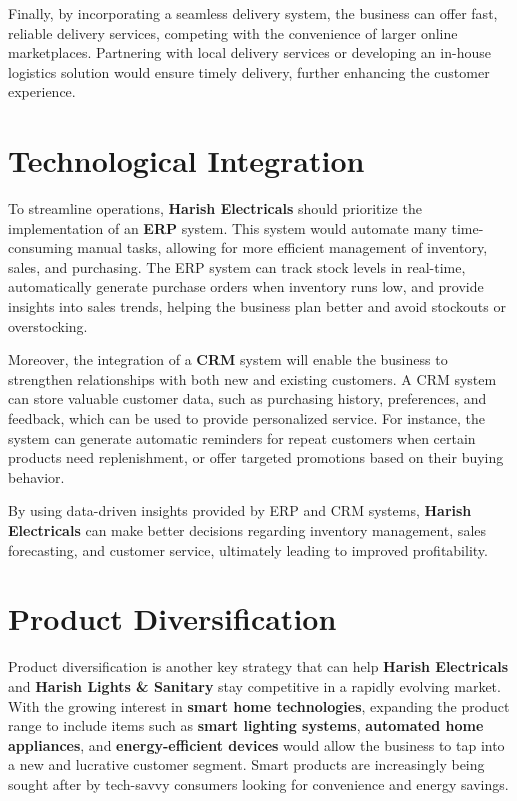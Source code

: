 \documentclass[a4paper,12pt]{report}
\begin{document}
Finally, by incorporating a seamless delivery system, the business can offer fast, reliable delivery services, competing with the convenience of larger online marketplaces. Partnering with local delivery services or developing an in-house logistics solution would ensure timely delivery, further enhancing the customer experience.

\section{Technological Integration}
To streamline operations, \textbf{Harish Electricals} should prioritize the implementation of an \textbf{ERP} system. This system would automate many time-consuming manual tasks, allowing for more efficient management of inventory, sales, and purchasing. The ERP system can track stock levels in real-time, automatically generate purchase orders when inventory runs low, and provide insights into sales trends, helping the business plan better and avoid stockouts or overstocking.

Moreover, the integration of a \textbf{CRM} system will enable the business to strengthen relationships with both new and existing customers. A CRM system can store valuable customer data, such as purchasing history, preferences, and feedback, which can be used to provide personalized service. For instance, the system can generate automatic reminders for repeat customers when certain products need replenishment, or offer targeted promotions based on their buying behavior.

By using data-driven insights provided by ERP and CRM systems, \textbf{Harish Electricals} can make better decisions regarding inventory management, sales forecasting, and customer service, ultimately leading to improved profitability.

\section{Product Diversification}
Product diversification is another key strategy that can help \textbf{Harish Electricals} and \textbf{Harish Lights \& Sanitary} stay competitive in a rapidly evolving market. With the growing interest in \textbf{smart home technologies}, expanding the product range to include items such as \textbf{smart lighting systems}, \textbf{automated home appliances}, and \textbf{energy-efficient devices} would allow the business to tap into a new and lucrative customer segment. Smart products are increasingly being sought after by tech-savvy consumers looking for convenience and energy savings.
\end{document}
